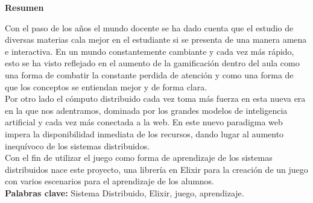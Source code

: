 \vskip 2cm

{\noindent\bfseries\Huge Resumen}

\vskip 1cm

Con el paso de los años el mundo docente se ha dado cuenta que el estudio de diversas materias cala mejor en el estudiante si se presenta de una manera amena e interactiva. En un mundo constantemente cambiante y cada vez más rápido, esto se ha visto reflejado en el aumento de la gamificación dentro del aula como una forma de combatir la constante perdida de atención y como una forma de que los conceptos se entiendan mejor y de forma clara.
\\

Por otro lado el cómputo distribuido cada vez toma más fuerza en esta nueva era en la que nos adentramos, dominada por los grandes modelos de inteligencia artificial y cada vez más conectada a la web. En este nuevo paradigma web impera la disponibilidad inmediata de los recursos, dando lugar al aumento inequívoco de los sistemas distribuidos.
\\

Con el fin de utilizar el juego como forma de aprendizaje de los sistemas distribuidos nace este proyecto, una librería en Elixir para la creación de un juego con varios escenarios para el aprendizaje de los alumnos.
\\

\textbf{Palabras clave:} Sistema Distribuido, Elixir, juego, aprendizaje.
